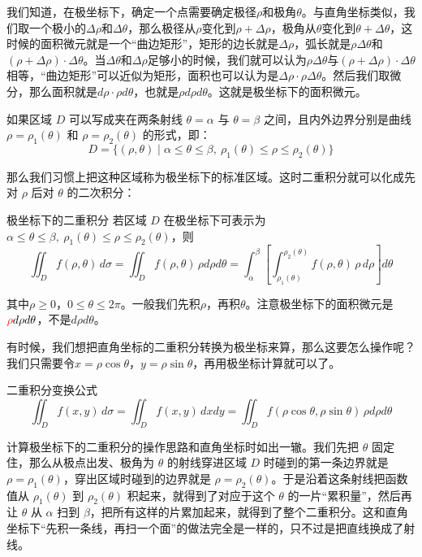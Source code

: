 我们知道，在极坐标下，确定一个点需要确定极径$\rho$和极角$\theta$。与直角坐标类似，我们取一个极小的$\Delta\rho$和$\Delta \theta$，那么极径从$\rho$变化到$\rho+\Delta\rho$，极角从$\theta$变化到$\theta+\Delta \theta$，这时候的面积微元就是一个“曲边矩形”，矩形的边长就是$\Delta\rho$，弧长就是$\rho\Delta \theta$和$(\rho+\Delta\rho)\cdot \Delta \theta$。当$\Delta \theta$和$\Delta\rho$足够小的时候，我们就可以认为$\rho\Delta \theta$与$(\rho+\Delta\rho)\cdot \Delta \theta$相等，“曲边矩形”可以近似为矩形，面积也可以认为是$\Delta\rho \cdot \rho\Delta \theta$。然后我们取微分，那么面积就是$d\rho \cdot \rho d\theta$，也就是$\rho d\rho d\theta$。这就是极坐标下的面积微元。

如果区域 \(D\) 可以写成夹在两条射线 \(\theta=\alpha\) 与 \(\theta=\beta\) 之间，且内外边界分别是曲线 \(\rho=\rho_1(\theta)\) 和 \(\rho=\rho_2(\theta)\) 的形式，即：
\[
D=\{(\rho,\theta)\mid \alpha\le\theta\le\beta,\ \rho_1(\theta)\le \rho\le \rho_2(\theta)\}
\]

那么我们习惯上把这种区域称为极坐标下的标准区域。这时二重积分就可以化成先对 \(\rho\) 后对 \(\theta\) 的二次积分：

\begin{theorem}{极坐标下的二重积分}{}
    若区域 \(D\) 在极坐标下可表示为 \(\alpha\le\theta\le\beta,\ \rho_1(\theta)\le \rho\le \rho_2(\theta)\)，则
    \[
    \iint_D f(\rho,\theta)\,d\sigma = \iint_D f(\rho,\theta)\,\rho d\rho d\theta = \int_\alpha^\beta\left[\int_{\rho_1(\theta)}^{\rho_2(\theta)} f(\rho,\theta)\,\rho\,d\rho\right]d\theta
    \]
\end{theorem}

其中$\rho\ge 0$，$0\le \theta \le2\pi$。一般我们先积$\rho$，再积$\theta$。注意极坐标下的面积微元是$\textcolor{red}{\rho}d\rho d\theta$，不是$d\rho d\theta$。

有时候，我们想把直角坐标的二重积分转换为极坐标来算，那么这要怎么操作呢？我们只需要令$x=\rho\cos\theta$，$y=\rho\sin\theta$，再用极坐标计算就可以了。

\begin{theorem}{二重积分变换公式}{}
    \[
    \iint_D f(x,y)\,d\sigma = \iint_D f(x,y)\,dxdy = \iint_D f(\rho\cos\theta,\rho\sin\theta)\,\rho d\rho d\theta
    \]
\end{theorem}

计算极坐标下的二重积分的操作思路和直角坐标时如出一辙。我们先把 \(\theta\) 固定住，那么从极点出发、极角为 \(\theta\) 的射线穿进区域 \(D\) 时碰到的第一条边界就是 \(\rho=\rho_1(\theta)\)，穿出区域时碰到的边界就是 \(\rho=\rho_2(\theta)\)。于是沿着这条射线把函数值从 \(\rho_1(\theta)\) 到 \(\rho_2(\theta)\) 积起来，就得到了对应于这个 \(\theta\) 的一片“累积量”，然后再让 \(\theta\) 从 \(\alpha\) 扫到 \(\beta\)，把所有这样的片累加起来，就得到了整个二重积分。这和直角坐标下“先积一条线，再扫一个面”的做法完全是一样的，只不过是把直线换成了射线。

